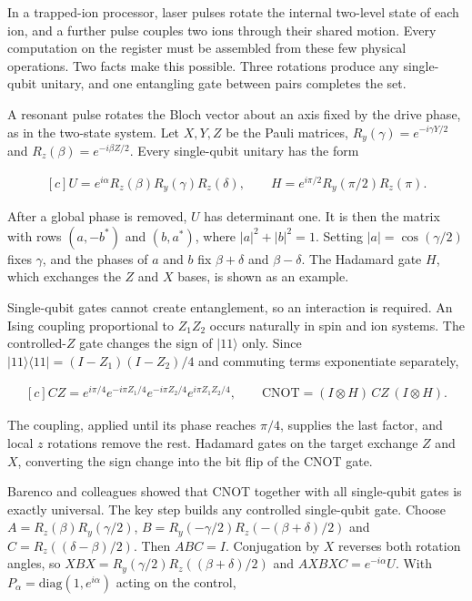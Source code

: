 \documentclass[11pt,oneside]{book}
\newenvironment{centeredalign}{\[\begin{gathered}[c]}{\end{gathered}\]}
\begin{document}
In a trapped-ion processor, laser pulses rotate the internal two-level state of each ion, and a further pulse couples two ions through their shared motion. Every computation on the register must be assembled from these few physical operations. Two facts make this possible. Three rotations produce any single-qubit unitary, and one entangling gate between pairs completes the set.

A resonant pulse rotates the Bloch vector about an axis fixed by the drive phase, as in the two-state system. Let \(X,Y,Z\) be the Pauli matrices, \(R_y(\gamma)=e^{-i\gamma Y/2}\) and \(R_z(\beta)=e^{-i\beta Z/2}\). Every single-qubit unitary has the form

\begin{centeredalign}
U=e^{i\alpha}R_z(\beta)R_y(\gamma)R_z(\delta),\qquad H=e^{i\pi/2}R_y(\pi/2)R_z(\pi).
\end{centeredalign}

After a global phase is removed, \(U\) has determinant one. It is then the matrix with rows \((a,-b^*)\) and \((b,a^*)\), where \(|a|^2+|b|^2=1\). Setting \(|a|=\cos(\gamma/2)\) fixes \(\gamma\), and the phases of \(a\) and \(b\) fix \(\beta+\delta\) and \(\beta-\delta\). The Hadamard gate \(H\), which exchanges the \(Z\) and \(X\) bases, is shown as an example.

Single-qubit gates cannot create entanglement, so an interaction is required. An Ising coupling proportional to \(Z_1Z_2\) occurs naturally in spin and ion systems. The controlled-\(Z\) gate changes the sign of \(|11\rangle\) only. Since \(|11\rangle\langle11|=(I-Z_1)(I-Z_2)/4\) and commuting terms exponentiate separately,

\begin{centeredalign}
CZ=e^{i\pi/4}e^{-i\pi Z_1/4}e^{-i\pi Z_2/4}e^{i\pi Z_1Z_2/4},\qquad
\mathrm{CNOT}=(I\otimes H)\,CZ\,(I\otimes H).
\end{centeredalign}

The coupling, applied until its phase reaches \(\pi/4\), supplies the last factor, and local \(z\) rotations remove the rest. Hadamard gates on the target exchange \(Z\) and \(X\), converting the sign change into the bit flip of the CNOT gate.

Barenco and colleagues showed that CNOT together with all single-qubit gates is exactly universal. The key step builds any controlled single-qubit gate. Choose \(A=R_z(\beta)R_y(\gamma/2)\), \(B=R_y(-\gamma/2)R_z(-(\beta+\delta)/2)\) and \(C=R_z((\delta-\beta)/2)\). Then \(ABC=I\). Conjugation by \(X\) reverses both rotation angles, so \(XBX=R_y(\gamma/2)R_z((\beta+\delta)/2)\) and \(AXBXC=e^{-i\alpha}U\). With \(P_\alpha=\mathrm{diag}(1,e^{i\alpha})\) acting on the control,
\end{document}
